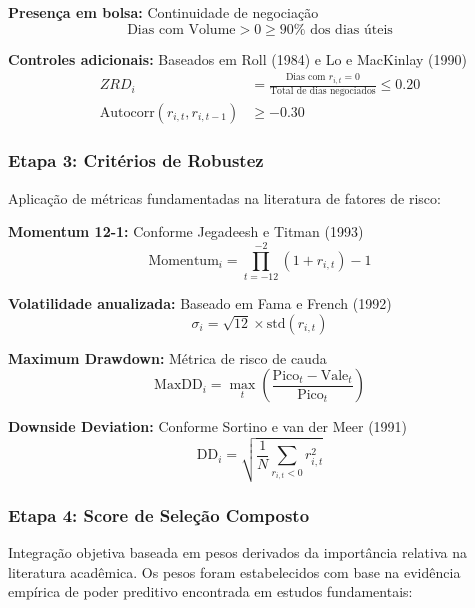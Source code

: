 \textbf{Presença em bolsa:} Continuidade de negociação
\begin{equation}
\text{Dias com Volume} > 0 \geq 90\% \text{ dos dias úteis}
\end{equation}

\textbf{Controles adicionais:} Baseados em Roll (1984) e Lo e MacKinlay (1990)
\begin{align}
ZRD_i &= \frac{\text{Dias com } r_{i,t} = 0}{\text{Total de dias negociados}} \leq 0.20 \\
\text{Autocorr}(r_{i,t}, r_{i,t-1}) &\geq -0.30
\end{align}

\subsubsection{Etapa 3: Critérios de Robustez}

Aplicação de métricas fundamentadas na literatura de fatores de risco:

\textbf{Momentum 12-1:} Conforme Jegadeesh e Titman (1993)
\begin{equation}
\text{Momentum}_{i} = \prod_{t=-12}^{-2}(1 + r_{i,t}) - 1
\end{equation}

\textbf{Volatilidade anualizada:} Baseado em Fama e French (1992)
\begin{equation}
\sigma_{i} = \sqrt{12} \times \text{std}(r_{i,t})
\end{equation}

\textbf{Maximum Drawdown:} Métrica de risco de cauda
\begin{equation}
\text{MaxDD}_i = \max_{t} \left( \frac{\text{Pico}_{t} - \text{Vale}_{t}}{\text{Pico}_{t}} \right)
\end{equation}

\textbf{Downside Deviation:} Conforme Sortino e van der Meer (1991)
\begin{equation}
\text{DD}_i = \sqrt{\frac{1}{N} \sum_{r_{i,t} < 0} r_{i,t}^2}
\end{equation}

\subsubsection{Etapa 4: Score de Seleção Composto}

Integração objetiva baseada em pesos derivados da importância relativa na literatura acadêmica. Os pesos foram estabelecidos com base na evidência empírica de poder preditivo encontrada em estudos fundamentais:

